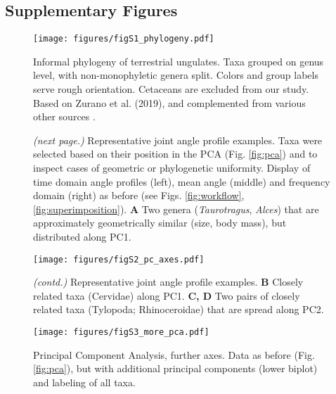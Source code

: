 \newpage
\subsection{Supplementary Figures}

\begin{figure}[h!]
\centering
\texttt{[image: figures/figS1\_phylogeny.pdf]}
\caption{Informal phylogeny of terrestrial ungulates. Taxa grouped on genus level, with non-monophyletic genera split. Colors and group labels serve rough orientation. Cetaceans are excluded from our study.
Based on Zurano et al. (2019), and complemented from various other sources \citep{Zurano2019,ParisiDutra2017,Frantz2015,Ryder2011,Price2009,Gongora2011,Funk2007,Hassanin2012}.
 }
\label{fig:phylogeny}
\end{figure}


\begin{figure} [b!]
  \caption{
\textit{(next page.)}
Representative joint angle profile examples.
Taxa were selected based on their position in the PCA (Fig. \ref*{fig:pca}) and to inspect cases of geometric or phylogenetic uniformity.
Display of time domain  angle profiles (left), mean  angle (middle) and frequency domain (right) as before (see Figs. \ref*{fig:workflow}, \ref*{fig:superimposition}).
\textbf{A} Two genera (\textit{Taurotragus}, \textit{Alces}) that are approximately geometrically similar (size, body mass), but distributed along PC1. %
  }
\end{figure}
\addtocounter{figure}{-1}

\clearpage
\begin{figure}[pt]
\centering
\texttt{[image: figures/figS2\_pc\_axes.pdf]}
\caption[Representative Examples]{
\textit{(contd.)}
Representative joint angle profile examples.
\textbf{B} Closely related taxa (Cervidae) along PC1.
\textbf{C, D} Two pairs of closely related taxa (Tylopoda; Rhinoceroidae) that are spread along PC2.
 }
\label{fig:examples}
\end{figure}

\clearpage
\begin{figure}[pt]
\centering
\texttt{[image: figures/figS3\_more\_pca.pdf]}
\caption[Further PC Axes]{Principal Component Analysis, further axes. Data as before (Fig. \ref*{fig:pca}), but with additional principal components (lower biplot) and labeling of all taxa.
 }
\label{fig:more_pca}
\end{figure}



